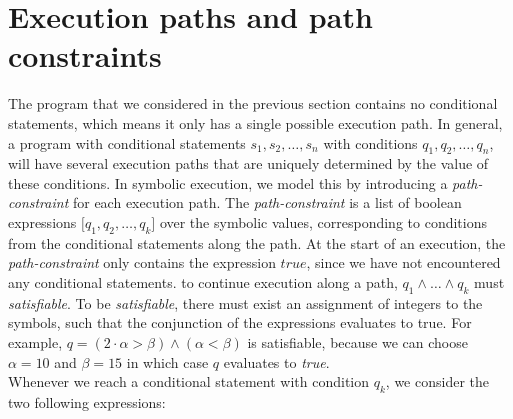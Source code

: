 \section{Execution paths and path constraints}
		The program that we considered in the previous section contains no conditional statements, which means it only has a single possible execution path. In general, a program with conditional statements $s_1, s_2, \ldots, s_n$ with conditions $q_1, q_2, \ldots, q_n$, will have several execution paths that are uniquely determined by the value of these conditions. In symbolic execution, we model this by introducing a \emph{path-constraint} for each execution path. The \emph{path-constraint} is a list of boolean expressions $\lbrack q_1, q_2, \ldots, q_k \rbrack$ over the symbolic values, corresponding to conditions from the conditional statements along the path. At the start of an execution, the \emph{path-constraint} only contains the expression $true$, since we have not encountered any conditional statements. to continue execution along a path, $q_1 \land \ldots \land q_k$ must \emph{satisfiable}. To be \emph{satisfiable}, there must exist an assignment of integers to the symbols, such that the conjunction of the expressions evaluates to true. For example, $q = (2\cdot \alpha > \beta) \land (\alpha < \beta)$ is satisfiable, because we can choose $\alpha = 10$ and $\beta = 15$ in which case $q$ evaluates to \emph{true}.
		\\ 
		Whenever we reach a conditional statement with condition $q_k$, we consider the two following expressions:
		

